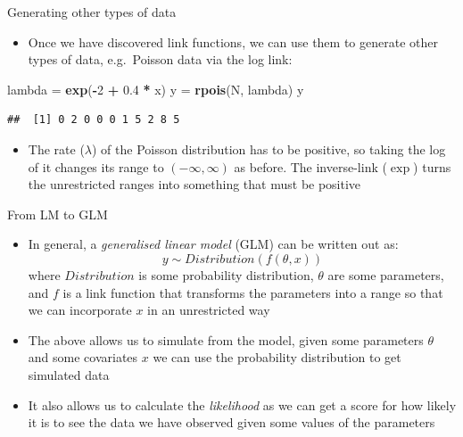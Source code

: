 \documentclass[ignorenonframetext,]{beamer}
\newenvironment{Shaded}{\begin{snugshade}}{\end{snugshade}}
\newcommand{\KeywordTok}[1]{\textcolor[rgb]{0.13,0.29,0.53}{\textbf{#1}}}
\newcommand{\DecValTok}[1]{\textcolor[rgb]{0.00,0.00,0.81}{#1}}
\newcommand{\FloatTok}[1]{\textcolor[rgb]{0.00,0.00,0.81}{#1}}
\newcommand{\StringTok}[1]{\textcolor[rgb]{0.31,0.60,0.02}{#1}}
\newcommand{\OperatorTok}[1]{\textcolor[rgb]{0.81,0.36,0.00}{\textbf{#1}}}
\newcommand{\NormalTok}[1]{#1}
\providecommand{\tightlist}{%
  \setlength{\itemsep}{0pt}\setlength{\parskip}{0pt}}
\begin{document}
\begin{frame}[fragile]{Generating other types of data}

\begin{itemize}
\tightlist
\item
  Once we have discovered link functions, we can use them to generate
  other types of data, e.g.~Poisson data via the log link:
\end{itemize}

\begin{Shaded}
\begin{Highlighting}[]
\NormalTok{lambda =}\StringTok{ }\KeywordTok{exp}\NormalTok{(}\OperatorTok{-}\DecValTok{2} \OperatorTok{+}\StringTok{ }\FloatTok{0.4} \OperatorTok{*}\StringTok{ }\NormalTok{x)}
\NormalTok{y =}\StringTok{ }\KeywordTok{rpois}\NormalTok{(N, lambda)}
\NormalTok{y}
\end{Highlighting}
\end{Shaded}

\begin{verbatim}
##  [1] 0 2 0 0 0 1 5 2 8 5
\end{verbatim}

\begin{itemize}
\tightlist
\item
  The rate (\(\lambda\)) of the Poisson distribution has to be positive,
  so taking the log of it changes its range to \((-\infty,\infty)\) as
  before. The inverse-link (\(\exp\)) turns the unrestricted ranges into
  something that must be positive
\end{itemize}

\end{frame}

\begin{frame}{From LM to GLM}

\begin{itemize}
\item
  In general, a \emph{generalised linear model} (GLM) can be written out
  as: \[y \sim Distribution(f(\theta, x))\] where \(Distribution\) is
  some probability distribution, \(\theta\) are some parameters, and
  \(f\) is a link function that transforms the parameters into a range
  so that we can incorporate \(x\) in an unrestricted way
\item
  The above allows us to simulate from the model, given some parameters
  \(\theta\) and some covariates \(x\) we can use the probability
  distribution to get simulated data
\item
  It also allows us to calculate the \emph{likelihood} as we can get a
  score for how likely it is to see the data we have observed given some
  values of the parameters
\end{itemize}

\end{frame}
\end{document}
